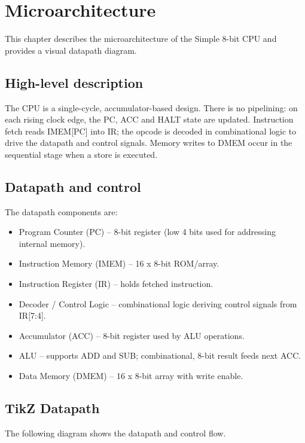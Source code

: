 \section{Microarchitecture}
This chapter describes the microarchitecture of the Simple 8-bit CPU and provides a visual datapath diagram.

\subsection{High-level description}
The CPU is a single-cycle, accumulator-based design. There is no pipelining: on each rising clock edge, the PC, ACC and HALT state are updated. Instruction fetch reads IMEM[PC] into IR; the opcode is decoded in combinational logic to drive the datapath and control signals. Memory writes to DMEM occur in the sequential stage when a store is executed.

\subsection{Datapath and control}
The datapath components are:
\begin{itemize}
  \item Program Counter (PC) -- 8-bit register (low 4 bits used for addressing internal memory).
  \item Instruction Memory (IMEM) -- 16 x 8-bit ROM/array.
  \item Instruction Register (IR) -- holds fetched instruction.
  \item Decoder / Control Logic -- combinational logic deriving control signals from IR[7:4].
  \item Accumulator (ACC) -- 8-bit register used by ALU operations.
  \item ALU -- supports ADD and SUB; combinational, 8-bit result feeds next ACC.
  \item Data Memory (DMEM) -- 16 x 8-bit array with write enable.
\end{itemize}

\subsection{TikZ Datapath}
The following diagram shows the datapath and control flow.

